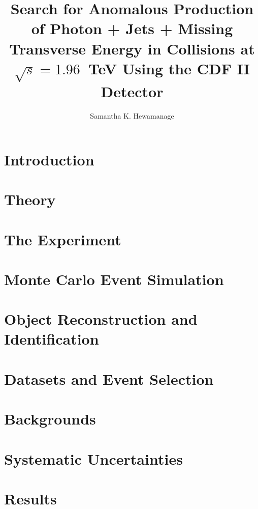 \documentclass{phd}     %
\title{Search for Anomalous Production of Photon + Jets + Missing Transverse Energy in \ppbar Collisions at $\sqrt{s}=1.96$~TeV Using the CDF II Detector}
\author{Samantha K. Hewamanage}
\theoremstyle{plain}
\theoremstyle{definition}
\numberwithin{equation}{chapter}
\numberwithin{theorem}{chapter}
\numberwithin{definition}{chapter}
\numberwithin{lemma}{chapter}
\numberwithin{corollary}{chapter}
\numberwithin{prop}{chapter}
\numberwithin{remark}{chapter}
\numberwithin{example}{chapter}
\numberwithin{table}{chapter}
\begin{document}
\chapter{Introduction}
%

\label{chp:Intro}

\chapter{Theory}\label{chp:Theory}


\chapter{The Experiment}\label{chp:Experiment}



\chapter{Monte Carlo Event Simulation}\label{chp:MCSimulation}


\chapter{Object Reconstruction and Identification}\label{chp:ObjectReco}



\chapter{Datasets and Event Selection}\label{chp:EventSelection}



\chapter{Backgrounds}\label{chp:Backgrounds}


\chapter{Systematic Uncertainties}\label{chp:Systematics}



\chapter{Results}\label{chp:Results}

\end{document}
